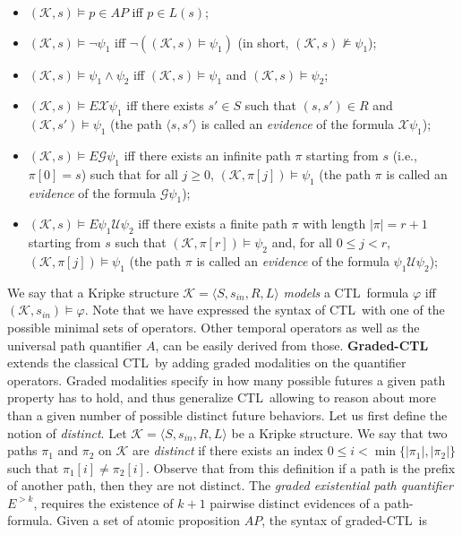 \documentclass[letterpaper,twocolumn,10pt]{article}
\def    \ctl        {\mbox{\textsc{CTL }\xspace}}
\def    \U          {\mathcal{U}}
\def    \G          {\mathcal{G}}
\def    \X          {\mathcal{X}}
\def    \K          {\mathcal{K}}
\begin{document}
\begin{itemize}
\item
$(\K, s) \models p \in AP$ iff $p \in L(s)$;
\item
$(\K, s) \models \neg\psi_1$ iff $\neg( (\K, s) \models \psi_1)$
(in short, $(\K, s) \not\models \psi_1$);
\item
$(\K, s) \models \psi_1 \wedge \psi_2$ iff $(\K, s) \models
\psi_1$ and $(\K, s) \models \psi_2$;
\item
$(\K, s) \models E \X \psi_1$ iff there exists $s' \in S$ such
that $(s, s') \in R$ and $(\K, s') \models \psi_1$ (the path
$\langle s, s' \rangle$ is called an \emph{evidence} of the formula
$\X \psi_1$);
\item
$(\K, s) \models E \G \psi_1$ iff there exists an infinite path
$\pi$ starting from $s$ (i.e., $\pi[0] = s$) such that for all $j
\geq 0$, $(\K, \pi[j]) \models \psi_1$ (the path $\pi$ is called
an \emph{evidence} of the formula $\G \psi_1$);
\item
$(\K, s) \models E \psi_1 \U \psi_2$ iff there exists a finite
path $\pi$ with length $|\pi| = r+1$ starting from $s$ such that
$(\K, \pi[r]) \models \psi_2$ and, for all $0 \leq j < r$, $(\K,
\pi[j]) \models \psi_1$ (the path $\pi$ is called an
\emph{evidence} of the formula $\psi_1 \U \psi_2$);
\end{itemize}
We say that a Kripke structure $\K = \langle S, s_{in}, R, L
\rangle$ \emph{models} a \ctl formula $\varphi$ iff $(\K, s_{in})
\models \varphi$.
Note that we have expressed the syntax of \ctl with one of the
possible minimal sets of operators. Other temporal operators as well as
the universal path quantifier $A$,  can be easily derived
from those.
\textbf{Graded-\ctl} extends the classical \ctl by adding graded modalities on the quantifier
operators. Graded modalities specify in how many possible futures  a given path property has to hold,
and thus generalize \ctl allowing to reason
about more than a given number of possible distinct future
behaviors. Let us first define the notion of {\em distinct}.
Let $\K = \langle S, s_{in}, R,
L \rangle$ be a Kripke structure. We say that two paths $\pi_1$
and $\pi_2$ on $\K$ are \emph{distinct} if there exists an index
$0 \leq i < \min\{ |\pi_1|, |\pi_2| \}$ such that $\pi_1[i] \neq
\pi_2[i]$. Observe that from this definition if a path is the
prefix of another path, then they are not distinct.
The \emph{graded existential path quantifier} $E^{>k}$, requires
the existence of $k+1$ pairwise distinct evidences of a path-formula. Given a
set of atomic proposition $AP$, the syntax of graded-\ctl is
\end{document}
